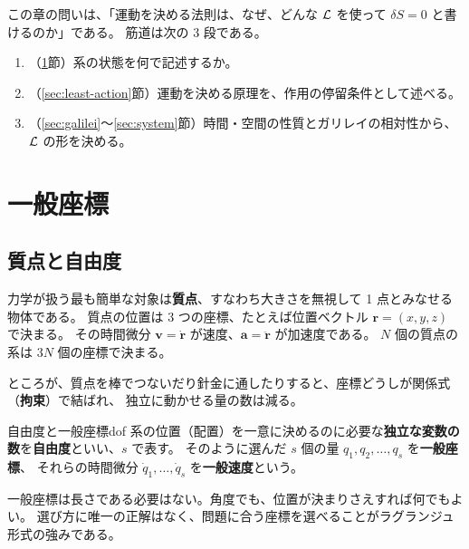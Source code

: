 この章の問いは、「運動を決める法則は、なぜ、どんな $\mathcal{L}$ を使って $\delta S=0$ と書けるのか」である。
筋道は次の 3 段である。
\begin{enumerate}
  \item（\ref{sec:gen-coords}節）系の状態を何で記述するか。
  \item（\ref{sec:least-action}節）運動を決める原理を、作用の停留条件として述べる。
  \item（\ref{sec:galilei}〜\ref{sec:system}節）時間・空間の性質とガリレイの相対性から、$\mathcal{L}$ の形を決める。
\end{enumerate}

\section{一般座標}\label{sec:gen-coords}

\subsection{質点と自由度}

力学が扱う最も簡単な対象は\textbf{質点}、すなわち大きさを無視して 1 点とみなせる物体である。
質点の位置は 3 つの座標、たとえば位置ベクトル $\bm r=(x,y,z)$ で決まる。
その時間微分 $\bm v=\dot{\bm r}$ が速度、$\bm a=\ddot{\bm r}$ が加速度である。
$N$ 個の質点の系は $3N$ 個の座標で決まる。

ところが、質点を棒でつないだり針金に通したりすると、座標どうしが関係式（\textbf{拘束}）で結ばれ、
独立に動かせる量の数は減る。

\begin{defn}{自由度と一般座標}{dof}
系の位置（配置）を一意に決めるのに必要な\textbf{独立な変数の数}を\textbf{自由度}といい、$s$ で表す。
そのように選んだ $s$ 個の量 $q_1,q_2,\dots,q_s$ を\textbf{一般座標}、
それらの時間微分 $\dot q_1,\dots,\dot q_s$ を\textbf{一般速度}という。
\end{defn}

一般座標は長さである必要はない。角度でも、位置が決まりさえすれば何でもよい。
選び方に唯一の正解はなく、問題に合う座標を選べることがラグランジュ形式の強みである。

